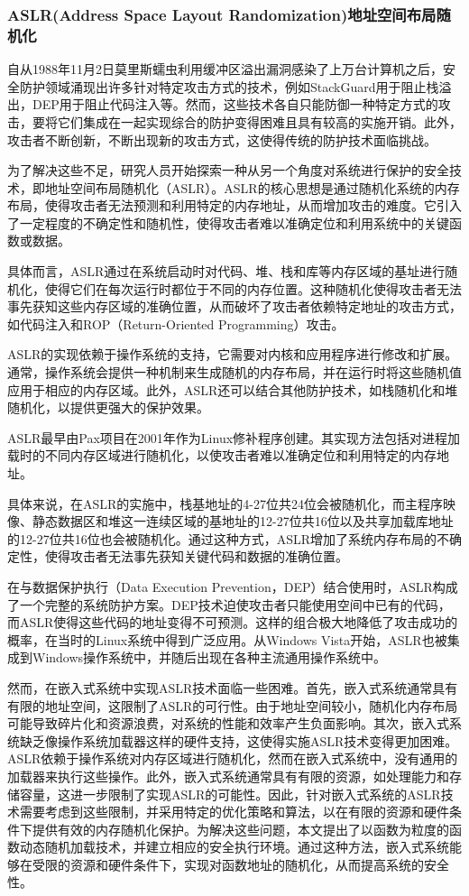 \documentclass[12pt,a4paper]{ctexart}
\numberwithin{figure}{section}
\begin{document}
\subsubsection{ASLR(Address Space Layout Randomization)地址空间布局随机化}
\par 自从1988年11月2日莫里斯蠕虫利用缓冲区溢出漏洞感染了上万台计算机之后，安全防护领域涌现出许多针对特定攻击方式的技术，例如StackGuard用于阻止栈溢出，DEP用于阻止代码注入等。然而，这些技术各自只能防御一种特定方式的攻击，要将它们集成在一起实现综合的防护变得困难且具有较高的实施开销。此外，攻击者不断创新，不断出现新的攻击方式，这使得传统的防护技术面临挑战。
\par 为了解决这些不足，研究人员开始探索一种从另一个角度对系统进行保护的安全技术，即地址空间布局随机化（ASLR）。ASLR的核心思想是通过随机化系统的内存布局，使得攻击者无法预测和利用特定的内存地址，从而增加攻击的难度。它引入了一定程度的不确定性和随机性，使得攻击者难以准确定位和利用系统中的关键函数或数据。
\par 具体而言，ASLR通过在系统启动时对代码、堆、栈和库等内存区域的基址进行随机化，使得它们在每次运行时都位于不同的内存位置。这种随机化使得攻击者无法事先获知这些内存区域的准确位置，从而破坏了攻击者依赖特定地址的攻击方式，如代码注入和ROP（Return-Oriented Programming）攻击。
\par ASLR的实现依赖于操作系统的支持，它需要对内核和应用程序进行修改和扩展。通常，操作系统会提供一种机制来生成随机的内存布局，并在运行时将这些随机值应用于相应的内存区域。此外，ASLR还可以结合其他防护技术，如栈随机化和堆随机化，以提供更强大的保护效果。
\par ASLR最早由Pax项目在2001年作为Linux修补程序创建。其实现方法包括对进程加载时的不同内存区域进行随机化，以使攻击者难以准确定位和利用特定的内存地址。
\par 具体来说，在ASLR的实施中，栈基地址的4-27位共24位会被随机化，而主程序映像、静态数据区和堆这一连续区域的基地址的12-27位共16位以及共享加载库地址的12-27位共16位也会被随机化。通过这种方式，ASLR增加了系统内存布局的不确定性，使得攻击者无法事先获知关键代码和数据的准确位置。
\par 在与数据保护执行（Data Execution Prevention，DEP）结合使用时，ASLR构成了一个完整的系统防护方案。DEP技术迫使攻击者只能使用空间中已有的代码，而ASLR使得这些代码的地址变得不可预测。这样的组合极大地降低了攻击成功的概率，在当时的Linux系统中得到广泛应用。从Windows Vista开始，ASLR也被集成到Windows操作系统中，并随后出现在各种主流通用操作系统中。
\par 然而，在嵌入式系统中实现ASLR技术面临一些困难。首先，嵌入式系统通常具有有限的地址空间，这限制了ASLR的可行性。由于地址空间较小，随机化内存布局可能导致碎片化和资源浪费，对系统的性能和效率产生负面影响。其次，嵌入式系统缺乏像操作系统加载器这样的硬件支持，这使得实施ASLR技术变得更加困难。ASLR依赖于操作系统对内存区域进行随机化，然而在嵌入式系统中，没有通用的加载器来执行这些操作。此外，嵌入式系统通常具有有限的资源，如处理能力和存储容量，这进一步限制了实现ASLR的可能性。因此，针对嵌入式系统的ASLR技术需要考虑到这些限制，并采用特定的优化策略和算法，以在有限的资源和硬件条件下提供有效的内存随机化保护。为解决这些问题，本文提出了以函数为粒度的函数动态随机加载技术，并建立相应的安全执行环境。通过这种方法，嵌入式系统能够在受限的资源和硬件条件下，实现对函数地址的随机化，从而提高系统的安全性。
\end{document}
